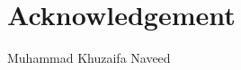 %
\chapter*{Acknowledgement}
\label{sec:acknowledgement}
\vspace*{-10mm}
%
%
%
%
%
\vspace{2em}
\noindent Muhammad Khuzaifa Naveed
